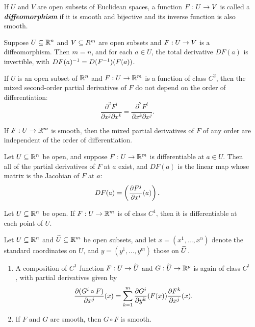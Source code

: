 \dfn If $U$ and $V$ are open subsets of Euclidean spaces, a function $F:U\rightarrow V$ is called a \textit{\textbf{diffeomorphism}} if it is smooth and bijective and its inverse function is also smooth.

\setcounter{thm}{3}

\begin{prop}
Suppose $U\subseteq \mathbb{R}^n$ and $V\subseteq R^m$ are open subsets and $F:U\rightarrow V$ is a diffeomorphism. Then $m = n$, and for each $a\in U$, the total derivative $DF(a)$ is invertible, with $DF(a)^{-1} = D(F^{-1})(F(a))$.
\end{prop} 

\setcounter{thm}{5}

\begin{prop}
If $U$ is an open subset of $\mathbb{R}^n$ and $F:U\rightarrow \mathbb{R}^m$ is a function of class $C^2$, then the mixed second-order partial derivatives of $F$ do not depend on the order of differentiation:
\[\frac{\partial^2F^i}{\partial x^j\partial x^k} = \frac{\partial^2F^i}{\partial x^k\partial x^j}.\]
\end{prop}



\crly If $F:U\rightarrow \mathbb{R}^m$ is smooth, then the mixed partial derivatives of $F$ of any order are independent of the order of differentiation.

\setcounter{thm}{7}

\begin{prop}
Let $U\subseteq \mathbb{R}^n$ be open, and suppose $F:U \rightarrow \mathbb{R}^m$ is differentiable at $a\in U$. Then all of the partial derivatives of $F$ at $a$ exist, and $DF(a)$ is the linear map whose matrix is the Jacobian of $F$ at $a$:
\[DF(a) = \left(\frac{\partial{F^j}}{\partial{x^i}}(a)\right).\]
\end{prop}


\setcounter{thm}{9}

\begin{prop}
 Let $U\subseteq \mathbb{R}^n$ be open. If $F:U\rightarrow \mathbb{R}^m$ is of class $C^1$, then it is differentiable at each point of $U$.
\end{prop}

\begin{cor}
Let $U\subseteq \mathbb{R}^n$ and $\widetilde U\subseteq \mathbb{R}^m$ be open subsets, and let $x = (x^1, \ldots, x^n)$ denote the standard coordinates on $U$, and $y = (y^1, \ldots, y^m)$ those on $\widetilde U$.
\begin{enumerate}
    \item A composition of $C^1$ function $F:U\rightarrow \widetilde U$ and $G:\widetilde U\rightarrow \mathbb{R}^p$ is again of class $C^1$, with partial derivatives given by 
    \[\frac{\partial{(G^i\circ F)}}{\partial{x^j}}(x) = \sum_{k = 1}^m\frac{\partial{G^i}}{\partial{y^k}}(F(x))\frac{\partial{F^k}}{\partial{x^j}}(x).\]
    \item If $F$ and $G$ are smooth, then $G\circ F$ is smooth.
\end{enumerate}
\end{cor}


